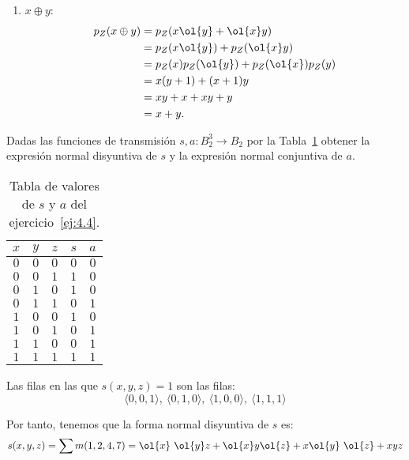 \begin{ejercicio}
\begin{enumerate}
        \item $x\oplus y$:
        \begin{align*}
            p_Z(x\oplus y) &= p_Z(x\ol{y} + \ol{x}y)\\
            &= p_Z(x\ol{y}) + p_Z(\ol{x}y)\\
            &= p_Z(x)p_Z(\ol{y}) + p_Z(\ol{x})p_Z(y)\\
            &= x(y+1) + (x+1)y\\
            &= xy + x + xy + y\\
            &= x + y.
        \end{align*}
    \end{enumerate}
\end{ejercicio}



\begin{ejercicio} \label{ej:4.4}
    Dadas las funciones de transmisión $s,a:B_2^3\to B_2$ por la Tabla~\ref{tab:4.4} obtener la expresión normal disyuntiva de $s$
    y la expresión normal conjuntiva de $a$.
    \begin{table}[H]
        \centering
        \begin{tabular}{ccc|cc}
            $x$ & $y$ & $z$ & $s$ & $a$\\
            \hline
            $0$ & $0$ & $0$ & $0$ & $0$\\
            $0$ & $0$ & $1$ & $1$ & $0$\\
            $0$ & $1$ & $0$ & $1$ & $0$\\
            $0$ & $1$ & $1$ & $0$ & $1$\\
            $1$ & $0$ & $0$ & $1$ & $0$\\
            $1$ & $0$ & $1$ & $0$ & $1$\\
            $1$ & $1$ & $0$ & $0$ & $1$\\
            $1$ & $1$ & $1$ & $1$ & $1$
        \end{tabular}
        \caption{Tabla de valores de $s$ y $a$ del ejercicio~\ref{ej:4.4}.}
        \label{tab:4.4}
    \end{table}

    Las filas en las que $s(x,y,z)=1$ son las filas:
    \begin{equation*}
        \langle 0,0,1\rangle,~\langle 0,1,0\rangle,~\langle 1,0,0\rangle,~\langle 1,1,1\rangle
    \end{equation*}

    Por tanto, tenemos que la forma normal disyuntiva de $s$ es:
    \begin{equation*}
        s(x,y,z)
        = \sum m(1,2,4,7)
        = \ol{x}~\ol{y}z + \ol{x}y\ol{z} + x\ol{y}~\ol{z} + xyz
    \end{equation*}


\end{ejercicio}
